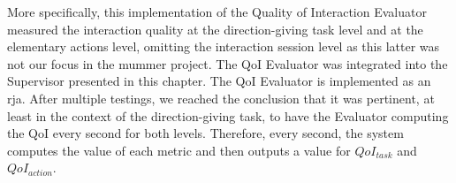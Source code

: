 \documentclass[a4paper,11pt,twoside]{StyleThese}
\begin{document}
More specifically, this implementation of the Quality of Interaction Evaluator measured the interaction quality at the direction-giving task level and at the elementary actions level, omitting the interaction session level as this latter was not our focus in the \acrshort{mummer} project. The QoI Evaluator was integrated into the Supervisor presented in this chapter. The QoI Evaluator is implemented as an \acrshort{rja}. After multiple testings, we reached the conclusion that it was pertinent, at least in the context of the direction-giving task, to have the Evaluator computing the QoI every second for both levels. Therefore, every second, the system computes the value of each metric and then outputs a value for $QoI_{task}$ and $QoI_{action}$. 

\begin{figure}[!htp]
	\hfill
	\hfill
	\hfill

\end{figure}
\end{document}
